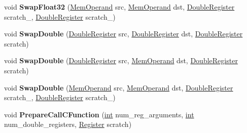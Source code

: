 \begin{DoxyCompactItemize}
\item 
\mbox{\label{classv8_1_1internal_1_1TurboAssembler_aa1db907554730812ae06a34ff6423555}} 
void {\bfseries Swap\+Float32} (\mbox{\hyperlink{classv8_1_1internal_1_1MemOperand}{Mem\+Operand}} src, \mbox{\hyperlink{classv8_1_1internal_1_1MemOperand}{Mem\+Operand}} dst, \mbox{\hyperlink{classv8_1_1internal_1_1DoubleRegister}{Double\+Register}} scratch\+\_, \mbox{\hyperlink{classv8_1_1internal_1_1DoubleRegister}{Double\+Register}} scratch\+\_)
\item 
\mbox{\label{classv8_1_1internal_1_1TurboAssembler_afd055fdfae69a6b38d24f7f96ef64b47}} 
void {\bfseries Swap\+Double} (\mbox{\hyperlink{classv8_1_1internal_1_1DoubleRegister}{Double\+Register}} src, \mbox{\hyperlink{classv8_1_1internal_1_1DoubleRegister}{Double\+Register}} dst, \mbox{\hyperlink{classv8_1_1internal_1_1DoubleRegister}{Double\+Register}} scratch)
\item 
\mbox{\label{classv8_1_1internal_1_1TurboAssembler_a99e65360c04b18e2e4d7eb7bd882bb5a}} 
void {\bfseries Swap\+Double} (\mbox{\hyperlink{classv8_1_1internal_1_1DoubleRegister}{Double\+Register}} src, \mbox{\hyperlink{classv8_1_1internal_1_1MemOperand}{Mem\+Operand}} dst, \mbox{\hyperlink{classv8_1_1internal_1_1DoubleRegister}{Double\+Register}} scratch)
\item 
\mbox{\label{classv8_1_1internal_1_1TurboAssembler_ac2aa1489f276a39f1dd2916115b8ee3f}} 
void {\bfseries Swap\+Double} (\mbox{\hyperlink{classv8_1_1internal_1_1MemOperand}{Mem\+Operand}} src, \mbox{\hyperlink{classv8_1_1internal_1_1MemOperand}{Mem\+Operand}} dst, \mbox{\hyperlink{classv8_1_1internal_1_1DoubleRegister}{Double\+Register}} scratch\+\_, \mbox{\hyperlink{classv8_1_1internal_1_1DoubleRegister}{Double\+Register}} scratch\+\_)
\item 
\mbox{\label{classv8_1_1internal_1_1TurboAssembler_ae111d12378cf9e12ef461e60a89f92e5}} 
void {\bfseries Prepare\+Call\+C\+Function} (\mbox{\hyperlink{classint}{int}} num\+\_\+reg\+\_\+arguments, \mbox{\hyperlink{classint}{int}} num\+\_\+double\+\_\+registers, \mbox{\hyperlink{classv8_1_1internal_1_1Register}{Register}} scratch)
\item 

\end{DoxyCompactItemize}
